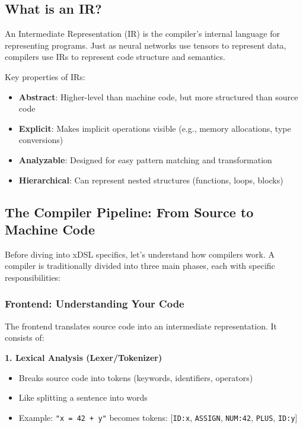 \documentclass[11pt,a4paper]{article}
\begin{document}
\subsection{What is an IR?}

An Intermediate Representation (IR) is the compiler's internal language for representing programs. Just as neural networks use tensors to represent data, compilers use IRs to represent code structure and semantics.

Key properties of IRs:
\begin{itemize}
    \item \textbf{Abstract}: Higher-level than machine code, but more structured than source code
    \item \textbf{Explicit}: Makes implicit operations visible (e.g., memory allocations, type conversions)
    \item \textbf{Analyzable}: Designed for easy pattern matching and transformation
    \item \textbf{Hierarchical}: Can represent nested structures (functions, loops, blocks)
\end{itemize}

\subsection{The Compiler Pipeline: From Source to Machine Code}

Before diving into xDSL specifics, let's understand how compilers work. A compiler is traditionally divided into three main phases, each with specific responsibilities:

\subsubsection{Frontend: Understanding Your Code}

The frontend translates source code into an intermediate representation. It consists of:

\textbf{1. Lexical Analysis (Lexer/Tokenizer)}
\begin{itemize}
    \item Breaks source code into tokens (keywords, identifiers, operators)
    \item Like splitting a sentence into words
    \item Example: \texttt{"x = 42 + y"} becomes tokens: [\texttt{ID:x}, \texttt{ASSIGN}, \texttt{NUM:42}, \texttt{PLUS}, \texttt{ID:y}]
\end{itemize}
\end{document}
